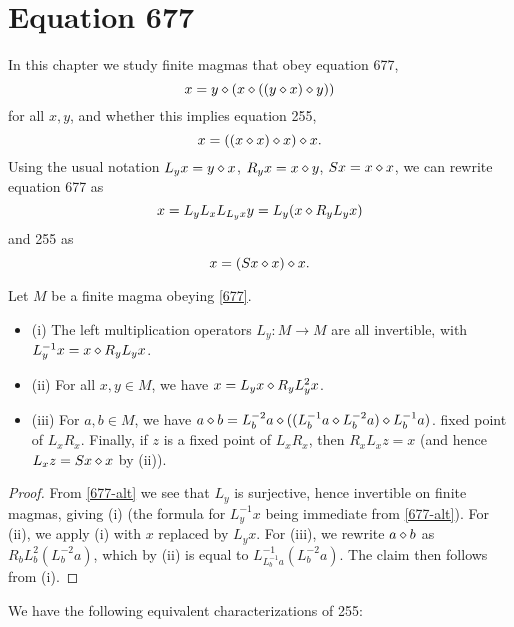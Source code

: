 \chapter{Equation 677}\label{677-chapter}

In this chapter we study finite magmas that obey equation 677,
\begin{equation}\label{677}
  x = y \diamond (x \diamond ((y \diamond x) \diamond y))
\end{equation}
for all $x,y$, and whether this implies equation 255,
\begin{equation}\label{255}
  x = ((x \diamond x) \diamond x) \diamond x.
\end{equation}
Using the usual notation $L_y x = y \diamond x$, $R_y x = x \diamond y$, $Sx = x \diamond x$, we can rewrite equation 677 as
\begin{equation}\label{677-alt}
  x = L_y L_x L_{L_y x} y = L_y (x \diamond R_y L_y x)
\end{equation}
and 255 as
$$ x = (Sx \diamond x) \diamond x.$$

\begin{lemma}\label{677-basic} Let $M$ be a finite magma obeying \eqref{677}.
  \begin{itemize}
  \item (i)  The left multiplication operators $L_y: M \to M$ are all invertible, with $L_y^{-1} x = x \diamond R_y L_y x$.
  \item (ii)  For all $x,y \in M$, we have $x = L_y x \diamond R_y L_y^2 x$.
  \item (iii) For $a,b \in M$, we have $a \diamond b = L_b^{-2} a \diamond ((L_b^{-1} a \diamond L_b^{-2} a) \diamond L_b^{-1} a)$.
fixed point of $L_x R_x$.  Finally, if $z$ is a fixed point of $L_x R_x$, then $R_x L_x z = x$ (and hence $L_x z = Sx \diamond x$ by (ii)).
\end{itemize}
\end{lemma}

\begin{proof}  From \eqref{677-alt} we see that $L_y$ is surjective, hence invertible on finite magmas, giving (i) (the formula for $L_y^{-1} x$ being immediate from \eqref{677-alt}).
  For (ii), we apply (i) with $x$ replaced by $L_y x$.  For (iii), we rewrite $a \diamond b$ as $R_b L_b^2 (L_b^{-2} a)$, which by (ii) is equal to $L_{L_b^{-1} a}^{-1} (L_b^{-2} a)$.  The claim then follows from (i).
\end{proof}

We have the following equivalent characterizations of 255:

